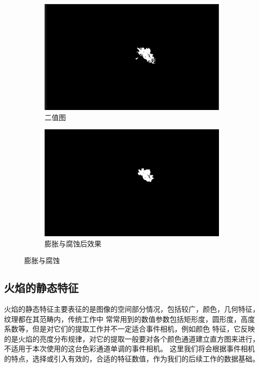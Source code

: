 \begin{figure}[ht]
    \centering
    \begin{subfigure}{0.49\textwidth}
        \centering
        \includegraphics[width=\textwidth]{figures/extract_process_03.png}
        \caption{二值图}
        \label{16.a}
    \end{subfigure}
    \hfill
    \begin{subfigure}{0.49\textwidth}
        \centering
        \includegraphics[width=\textwidth]{figures/extract_process_04.png}
        \caption{膨胀与腐蚀后效果}
        \label{16.b}
    \end{subfigure}
    \caption{膨胀与腐蚀}
    \label{16}
\end{figure}

\subsection{火焰的静态特征}
火焰的静态特征主要表征的是图像的空间部分情况，包括较广，颜色，几何特征，纹理都在其范畴内，传统工作中
常常用到的数值参数包括矩形度，圆形度，高度系数等，但是对它们的提取工作并不一定适合事件相机，例如颜色
特征，它反映的是火焰的亮度分布规律，对它的提取一般要对各个颜色通道建立直方图来进行，不适用于本次使用的这台色彩通道单调的事件相机。
这里我们将会根据事件相机的特点，选择或引入有效的，合适的特征数值，作为我们的后续工作的数据基础。

